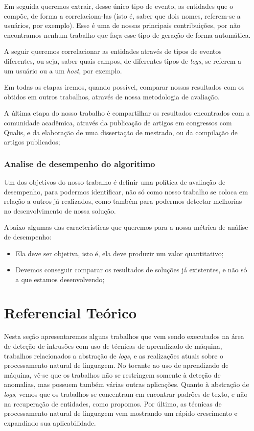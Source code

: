 \documentclass[
	12pt,				%
	openright,			%
	twoside,			%
	a4paper,			%
	english,			%
	spanish,			%
	brazil,				%
	]{abntex2}
\begin{document}
Em seguida queremos extrair, desse único tipo de evento, as entidades que o compõe, de forma a correlaciona-las (isto é, saber que dois nomes, referem-se a usuários, por exemplo). Esse é uma de nossas principais contribuições, por não encontramos nenhum trabalho que faça esse tipo de geração de forma automática.

A seguir queremos correlacionar as entidades através de tipos de eventos diferentes, ou seja, saber quais campos, de diferentes tipos de \emph{logs}, se referem a um usuário ou a um \emph{host}, por exemplo.

Em todas as etapas iremos, quando possível, comparar nossas resultados com os obtidos em outros trabalhos, através de nossa metodologia de avaliação.

A última etapa do nosso trabalho é compartilhar os resultados encontrados com a comunidade acadêmica, através da publicação de artigos em congressos com Qualis, e  da elaboração de uma dissertação de mestrado, ou da compilação de artigos publicados;

\subsection{Analise de desempenho do algoritimo}

Um dos objetivos do nosso trabalho é definir uma política de avaliação de desempenho, para podermos identificar, não só como nosso trabalho se coloca em relação a outros já realizados, como também para podermos detectar melhorias no desenvolvimento de nossa solução.

Abaixo algumas das características que queremos para a nossa métrica de análise de desempenho:

\begin{itemize}
	\item Ela deve ser objetiva, isto é, ela deve produzir um valor quantitativo;
	\item Devemos conseguir comparar os resultados de soluções já existentes, e não só a que estamos desenvolvendo;
\end{itemize}

\chapter{Referencial Teórico}\label{chap:referencial}

Nesta seção apresentaremos alguns trabalhos que vem sendo executados na área de deteção de intrusões com uso de técnicas de aprendizado de máquina, trabalhos relacionados a abstração de \emph{logs}, e as realizações atuais sobre o processamento natural de linguagem. No tocante ao uso de aprendizado de máquina, vê-se que os trabalhos não se restringem somente à deteção de anomalias, mas possuem também várias outras aplicações. Quanto à abstração de \emph{logs}, vemos que os trabalhos se concentram em encontrar padrões de texto, e não na recuperação de entidades, como propomos. Por último, as técnicas de processamento natural de linguagem vem mostrando um rápido crescimento e expandindo sua aplicabilidade.
\end{document}
